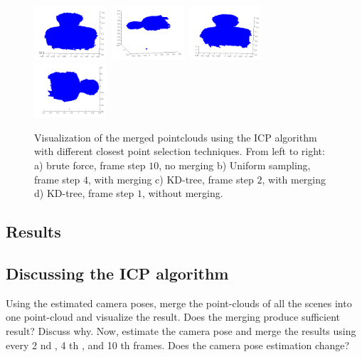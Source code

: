 \begin{figure}[bt!]
  \centering
    \includegraphics[width=0.24\textwidth]{figures/unBf10.png}\	
    \includegraphics[width=0.24\textwidth]{figures/meUs4.png}\	
    \includegraphics[width=0.24\textwidth]{figures/meKd2.png}\	
    \includegraphics[width=0.24\textwidth]{figures/unKd1.png}
    \caption{Visualization of the merged pointclouds using the ICP algorithm with different closest point selection techniques. From left to right: a) brute force, frame step $10$, no merging b) Uniform sampling, frame step $4$, with merging c) KD-tree, frame step $2$, with merging d) KD-tree, frame step $1$, without merging. }
    \label{fig:mergedICP}
\end{figure}

\subsection{Results}




\subsection{Discussing the ICP algorithm}
Using the estimated camera poses, merge the point-clouds of all the scenes into one point-cloud and visualize the result. Does the merging produce sufficient result? Discuss why. Now, estimate the camera pose and merge the results using every 2 nd , 4 th , and 10 th frames. Does the camera pose estimation change?




